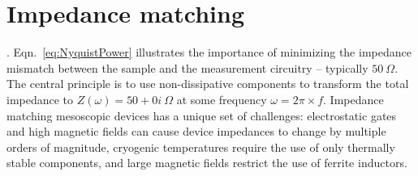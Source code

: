 \section{Impedance matching}\label{section:matching}
. Eqn.~\ref{eq:NyquistPower} illustrates the importance of minimizing the impedance mismatch between the sample and the measurement circuitry -- typically $50~\Omega$. The central principle is to use non-dissipative components to transform the total impedance to $Z(\omega) = 50+0i~\Omega$ at some frequency $\omega = 2\pi\times f$. Impedance matching mesoscopic devices has a unique set of challenges: electrostatic gates and high magnetic fields can cause device impedances to change by multiple orders of magnitude, cryogenic temperatures require the use of only thermally stable components, and large magnetic fields restrict the use of ferrite inductors.

